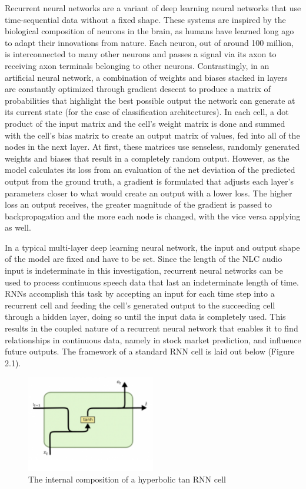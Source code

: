 Recurrent neural networks are a variant of deep learning neural networks that use time-sequential data without a fixed shape. These systems are inspired by the biological composition of neurons in the brain, as humans have learned long ago to adapt their innovations from nature. Each neuron, out of around 100 million, is interconnected to many other neurons and passes a signal via its axon to receiving axon terminals belonging to other neurons. Contrastingly, in an artificial neural network, a combination of weights and biases stacked in layers are constantly optimized through gradient descent to produce a matrix of probabilities that highlight the best possible output the network can generate at its current state (for the case of classification architectures). In each cell, a dot product of the input matrix and the cell’s weight matrix is done and summed with the cell’s bias matrix to create an output matrix of values, fed into all of the nodes in the next layer. At first, these matrices use senseless, randomly generated weights and biases that result in a completely random output. However, as the model calculates its loss from an evaluation of the net deviation of the predicted output from the ground truth, a gradient is formulated that adjusts each layer’s parameters closer to what would create an output with a lower loss. The higher loss an output receives, the greater magnitude of the gradient is passed to backpropagation and the more each node is changed, with the vice versa applying as well.
\newline\par
In a typical multi-layer deep learning neural network, the input and output shape of the model are fixed and have to be set. Since the length of the NLC audio input is indeterminate in this investigation, recurrent neural networks can be used to process continuous speech data that last an indeterminate length of time. RNNs accomplish this task by accepting an input for each time step into a recurrent cell and feeding the cell’s generated output to the succeeding cell through a hidden layer, doing so until the input data is completely used. This results in the coupled nature of a recurrent neural network that enables it to find relationships in continuous data, namely in stock market prediction, and influence future outputs. The framework of a standard RNN cell is laid out below (Figure 2.1).

\begin{figure}[th]
    \centering
    \includegraphics[width=0.5\textwidth]{Figures/rnnarch.png}
    \decoRule
    \caption[RNNCell]{The internal composition of a hyperbolic tan RNN cell}
    \label{fig:RNNCell}
\end{figure}


